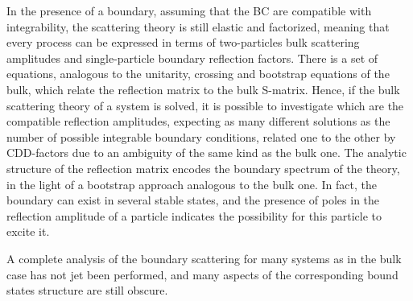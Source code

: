 \documentclass[a4paper,12pt]{report}
\begin{document}
In the presence of a boundary, assuming that the BC are compatible with integrability, the scattering theory is
still elastic and factorized, meaning that every process can be expressed in terms of two-particles bulk
scattering amplitudes and single-particle boundary reflection factors. There is a set of equations, analogous to
the unitarity, crossing and bootstrap equations of the bulk, which relate the reflection matrix to the bulk
S-matrix. Hence, if the bulk scattering theory of a system is solved, it is possible to investigate which are the
compatible reflection amplitudes, expecting as many different solutions as the number of possible integrable
boundary conditions, related one to the other by CDD-factors due to an ambiguity of the same kind as the bulk
one. The analytic structure of the reflection matrix encodes the boundary spectrum of the theory, in the light of
a bootstrap approach analogous to the bulk one. In fact, the boundary can exist in several stable states, and the
presence of poles in the reflection amplitude of a particle indicates the possibility for this particle to excite
it.

A complete analysis of the boundary scattering for many systems as in the bulk case has not jet been performed,
and many aspects of the corresponding bound states structure are still obscure.
\end{document}
